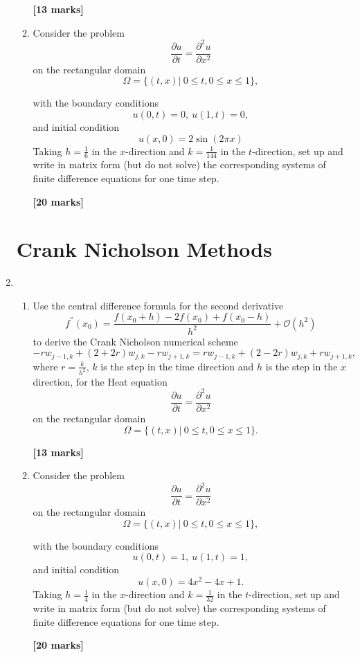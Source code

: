 \begin{enumerate}
\begin{enumerate}
\begin{flushright}
\textbf{[13 marks]}
\end{flushright}
	\item Consider the problem
	\[\frac{\partial u}{\partial t}=\frac{\partial^2 u}{\partial x^2} \]
	on the rectangular domain
		\[\Omega=\{(t,x)| \ 0\leq t, 0 \leq x \leq 1\}, \]

	with the boundary conditions
	\[ u(0,t)=0, \ u(1,t)=0,   \]
	and initial condition
	\[	u(x,0)=2\sin(2\pi x) \]
		Taking $h=\frac{1}{6}$ in the $x$-direction and $k=\frac{1}{144}$ in the $t$-direction, set up and write in matrix form (but do not solve) the corresponding systems of finite difference equations for one time step.\\
\begin{flushright}
\textbf{[20 marks]}
\end{flushright}
	
	
\end{enumerate}


\section{Crank Nicholson Methods}

	\item 
\begin{enumerate}
	
	\item 
	Use the central difference formula for the second derivative 
	\[ f^{''}(x_0)=\frac{f(x_0+h)-2f(x_0)+f(x_0-h)}{h^2}+\mathcal{O}(h^2)\]
	to derive the Crank Nicholson numerical scheme
	\[-rw_{j-1,k}+(2+2r)w_{j,k}-rw_{j+1,k}=rw_{j-1,k}+(2-2r)w_{j,k}+rw_{j+1,k},\]
	where $r=\frac{k}{h^2}$, $k$ is the step in the time direction and $h$ is the step in the $x$ direction, 
	for the Heat equation 
	\[\frac{\partial u}{\partial t}=\frac{\partial^2 u}{\partial x^2} \]
	on the rectangular domain
		\[\Omega=\{(t,x)| \ 0\leq t, 0 \leq x \leq 1\}. \]

\begin{flushright}
\textbf{[13 marks]}
\end{flushright}
	
	\item Consider the problem
	\[\frac{\partial u}{\partial t}=\frac{\partial^2 u}{\partial x^2} \]
	on the rectangular domain
		\[\Omega=\{(t,x)| \ 0\leq t, 0 \leq x \leq 1\}, \]

	with the boundary conditions
	\[ u(0,t)=1, \ u(1,t)=1,   \]
	and initial condition
	\[	u(x,0)=4x^2-4x+1.\]
		Taking $h=\frac{1}{4}$ in the $x$-direction and $k=\frac{1}{32}$ in the $t$-direction, set up and write in matrix form (but do not solve) the corresponding systems of finite difference equations for one time step.\\
\begin{flushright}
\textbf{[20 marks]}
\end{flushright}
\end{enumerate}


\end{enumerate}
